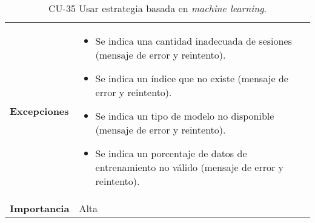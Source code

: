 \begin{table}[p]
\begin{tabularx}{\linewidth}{ p{} p{} }
		\textbf{Excepciones}          & 
		\begin{itemize}
			\tightlist
			\item Se indica una cantidad inadecuada de sesiones (mensaje de error y reintento).
			\item Se indica un índice que no existe (mensaje de error y reintento).
			\item Se indica un tipo de modelo no disponible (mensaje de error y reintento).
			\item Se indica un porcentaje de datos de entrenamiento no válido (mensaje de error y reintento).
		\end{itemize} \\
		\textbf{Importancia}          & Alta \\
		\bottomrule
	\end{tabularx}
	\caption{CU-35 Usar estrategia basada en \emph{machine learning}.}
\end{table}